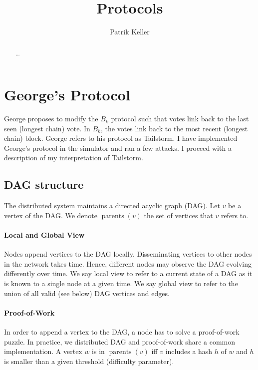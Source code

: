 \documentclass[a4paper]{article}
\newcommand{\parents}{\operatorname{parents}}
\begin{document}
\title{Protocols}
\author{Patrik Keller}

\begin{abstract}
\dots
\end{abstract}

\maketitle

\section{George's Protocol}

George proposes to modify the $B_k$ protocol such that votes link back to the last seen (longest chain) vote.
In $B_k$, the votes link back to the most recent (longest chain) block.
George refers to his protocol as Tailstorm.
I have implemented George's protocol in the simulator and ran a few attacks.
I proceed with a description of my interpretation of Tailstorm.

\subsection{DAG structure}

The distributed system maintains a directed acyclic graph (DAG).
Let $v$ be a vertex of the DAG.
We denote $\parents(v)$ the set of vertices that $v$ refers to.

\paragraph{Local and Global View}

Nodes append vertices to the DAG locally.
Disseminating vertices to other nodes in the network takes time.
Hence, different nodes may observe the DAG evolving differently over time.
We say local view to refer to a current state of a DAG as it is known to a single node at a given time.
We say global view to refer to the union of all valid (see below) DAG vertices and edges.

\paragraph{Proof-of-Work}
In order to append a vertex to the DAG, a node has to solve a proof-of-work puzzle.
In practice, we distributed DAG and proof-of-work share a common implementation.
A vertex $w$ is in $\parents(v)$ iff $v$ includes a hash $h$ of $w$ and $h$ is smaller than a given threshold (difficulty parameter).
\end{document}
